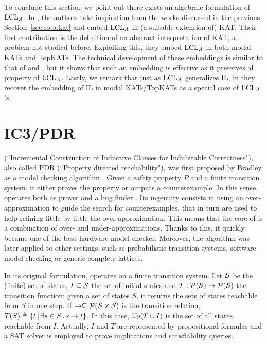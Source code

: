 To conclude this section, we point out there exists an algebraic formulation of $\text{LCL}_A$. In \cite{MR22}, the authors take inspiration from the works discussed in the previous Section~\ref{sec:sota:kat} and embed $\text{LCL}_A$ in (a suitable extension of) KAT. Their first contribution is the definition of an abstract interpretation of KAT, a problem not studied before. Exploiting this, they embed $\text{LCL}_A$ in both modal KATs and TopKATs. The technical development of these embeddings is similar to that of \cite{MOH21} and \cite{ZAG22}, but it shows that such an embedding is effective as it preserves al property of $\text{LCL}_A$. Lastly, we remark that just as $\text{LCL}_A$ generalizes IL, in \cite{MR22} they recover the embedding of IL in modal KATs/TopKATs as a special case of $\text{LCL}_A$'s.

\section{IC3/PDR}\label{sec:sota:pdr}
 (``Incremental Construction of Inductive Clauses for Indubitable Correctness"), also called PDR (``Property directed reachability"), was first proposed by Bradley as a model checking algorithm \cite{Bradley11}. Given a safety property $P$ and a finite transition system, it either proves the property or outputs a counterexample. In this sense,  operates both as prover and a bug finder \cite{Bradley12}. Its ingenuity consists in using an over-approximation to guide the search for counterexamples, that in turn are used to help refining little by little the over-approximation. This means that the core of  is a combination of over- and under-approximations.
Thanks to this, it quickly became one of the best hardware model checker. Moreover, the algorithm was later applied to other settings, such as probabilistic transition systems, software model checking or generic complete lattices.

In its original formulation,  operates on a finite transition system. Let $\mathcal{S}$ be the (finite) set of states, $I \subseteq \mathcal{S}$ the set of initial states and $T : \mathcal{P}(\mathcal{S}) \rightarrow \mathcal{P}(\mathcal{S})$ the transition function: given a set of states $S$, it returns the sets of states reachable from $S$ in one step. If $\rightarrow \subseteq \mathcal{P}(\mathcal{S} \times \mathcal{S})$ is the transition relation, $T(S) \triangleq \{ t \,\vert\, \exists s \in S \,.\, s \rightarrow t \}$. In this case, $\text{lfp}(T \cup I)$ is the set of all states reachable from $I$.
Actually, $I$ and $T$ are represented by propositional formulas and a SAT solver is employed to prove implications and satisfiability queries.


